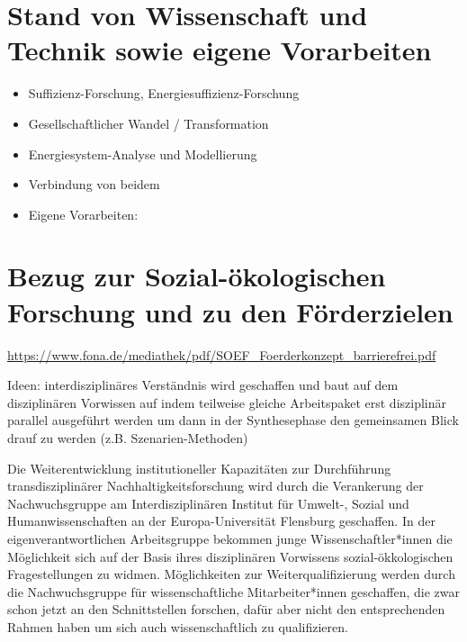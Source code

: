 \documentclass[a4paper,11pt,twoside]{scrartcl}
\begin{document}
\section{Stand von Wissenschaft und Technik sowie eigene Vorarbeiten}
\begin{itemize}
    \item Suffizienz-Forschung, Energiesuffizienz-Forschung
    \item Gesellschaftlicher Wandel / Transformation 
    \item Energiesystem-Analyse und Modellierung
    \item Verbindung von beidem
    \item Eigene Vorarbeiten: 
\end{itemize}

 

\section{Bezug zur Sozial-ökologischen Forschung und zu den Förderzielen}

\url{https://www.fona.de/mediathek/pdf/SOEF_Foerderkonzept_barrierefrei.pdf}

Ideen:
interdisziplinäres Verständnis wird geschaffen und baut auf dem disziplinären Vorwissen auf indem teilweise gleiche Arbeitspaket erst disziplinär parallel ausgeführt werden um dann in der Synthesephase den gemeinsamen Blick drauf zu werden (z.B. Szenarien-Methoden)

Die Weiterentwicklung institutioneller Kapazitäten zur Durchführung transdisziplinärer Nachhaltigkeitsforschung wird durch die Verankerung der Nachwuchsgruppe am Interdisziplinären Institut für Umwelt-, Sozial und Humanwissenschaften an der Europa-Universität Flensburg geschaffen. In der eigenverantwortlichen Arbeitsgruppe bekommen junge Wissenschaftler*innen die Möglichkeit sich auf der Basis ihres disziplinären Vorwissens sozial-ökkologischen Fragestellungen zu  widmen. Möglichkeiten zur Weiterqualifizierung werden durch die  Nachwuchsgruppe für wissenschaftliche Mitarbeiter*innen geschaffen, die zwar schon jetzt an den Schnittstellen forschen, dafür aber nicht den entsprechenden Rahmen haben um sich auch wissenschaftlich zu qualifizieren.
\end{document}
